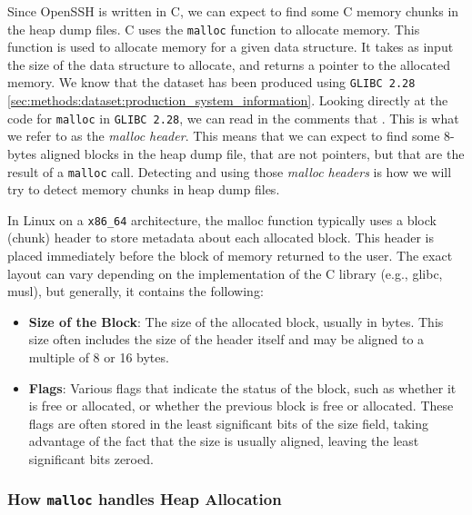     Since OpenSSH is written in C, we can expect to find some C memory chunks in the heap dump files. C uses the \lstinline[language=c]|malloc| function to allocate memory. This function is used to allocate memory for a given data structure. It takes as input the size of the data structure to allocate, and returns a pointer to the allocated memory. We know that the dataset has been produced using \texttt{GLIBC 2.28} \ref{sec:methods:dataset:production_system_information}. Looking directly at the code for \lstinline[language=c]|malloc| in \texttt{GLIBC 2.28}, we can read in the comments that  \cite{MallocGLIBC2001}. This is what we refer to as the \textit{malloc header}. This means that we can expect to find some 8-bytes aligned blocks in the heap dump file, that are not pointers, but that are the result of a \lstinline[language=c]|malloc| call. Detecting and using those \textit{malloc headers} is how we will try to detect memory chunks in heap dump files.

    In Linux on a \texttt{x86\_64} architecture, the malloc function typically uses a block (chunk) header to store metadata about each allocated block. This header is placed immediately before the block of memory returned to the user. The exact layout can vary depending on the implementation of the C library (e.g., glibc, musl), but generally, it contains the following:

    \begin{itemize}
        \item \textbf{Size of the Block}: The size of the allocated block, usually in bytes. This size often includes the size of the header itself and may be aligned to a multiple of 8 or 16 bytes.
        \item \textbf{Flags}: Various flags that indicate the status of the block, such as whether it is free or allocated, or whether the previous block is free or allocated. These flags are often stored in the least significant bits of the size field, taking advantage of the fact that the size is usually aligned, leaving the least significant bits zeroed.
    \end{itemize}

    \subsubsection{How \texttt{malloc} handles Heap Allocation}

